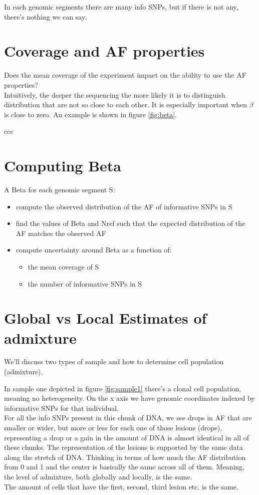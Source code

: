 In each genomic segments there are many info SNPs, but if there is not any, there's nothing we can say.

\section{Coverage and AF properties}
Does the mean coverage of the experiment impact on the ability to use the AF properties?\\
Intuitively, the deeper the sequencing the more likely it is to distinguish distribution that are not so close to each other. It is especially important when $\beta$ is close to zero. An example is shown in figure \ref{fig:beta}.

ccc

\section{Computing Beta}
A Beta for each genomic segment S:
\begin{itemize}
\item compute the observed distribution of the AF of
informative SNPs in S
\item find the values of Beta and Nref such that the expected
distribution of the AF matches the observed AF
\item compute uncertainty around Beta as a function of:
	\begin{itemize}
	\item the mean coverage of S
	\item the number of informative SNPs in S
	\end{itemize}
\end{itemize}

\section{Global vs Local Estimates of admixture}
We'll discuss two types of sample and how to determine cell population (admixture).

In sample one depicted in figure \ref{fig:sample1} there's a clonal cell population, meaning no heterogeneity. On the x axis we have genomic coordinates indexed by informative SNPs for that individual.
\\
For all the info SNPs present in this chunk of DNA, we see drops in AF that are smaller or wider, but more or less for each one of those lesions (drops), representing a drop or a gain in the amount of DNA is almost identical in all of these chunks.  
The representation of the lesions is supported by the same data along the stretch of DNA.
Thinking in terms of how much the AF distribution from 0 and 1 and the center is basically the same across all of them. Meaning, the level of admixture, both globally and locally, is the same. \\
The amount of cells that have the first, second, third lesion etc. is the same.

